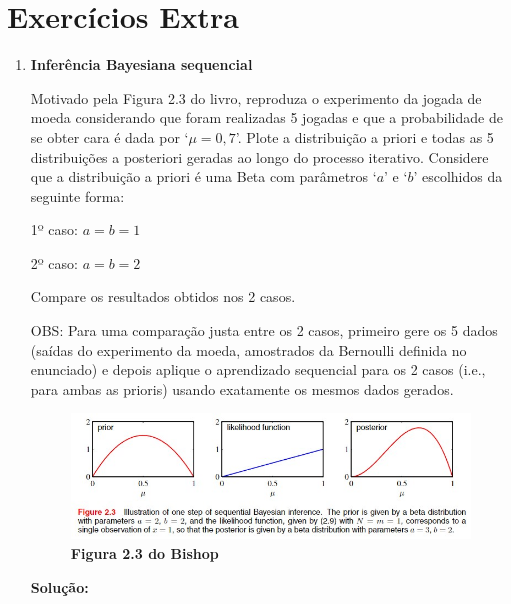 \section*{Exercícios Extra}

\begin{enumerate}[label=E\arabic*]


\item \textbf{Inferência Bayesiana sequencial} \par
Motivado pela Figura 2.3 do livro, reproduza o
experimento da jogada de moeda considerando que foram realizadas 5 jogadas e que a
probabilidade de se obter cara é dada por `$\mu = 0,7$'. Plote a distribuição a priori e todas
as 5 distribuições a posteriori geradas ao longo do processo iterativo. Considere que a
distribuição a priori é uma Beta com parâmetros `$a$' e `$b$' escolhidos da seguinte forma:

1º caso: $a = b = 1$

2º caso: $a = b = 2$

Compare os resultados obtidos nos 2 casos.

OBS: Para uma comparação justa entre os 2 casos, primeiro gere os 5 dados (saídas do
experimento da moeda, amostrados da Bernoulli definida no enunciado) e depois aplique
o aprendizado sequencial para os 2 casos (i.e., para ambas as prioris) usando
exatamente os mesmos dados gerados.
\begin{figure}[H]
    \caption{\textbf{Figura 2.3 do Bishop}}
       \centering
       \includegraphics{bishop_23.jpg}
\end{figure}
\par
\textbf{Solução:}


\end{enumerate}
